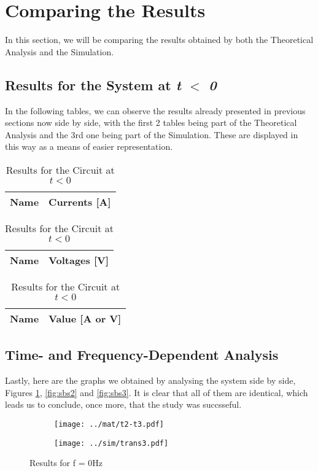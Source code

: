\clearpage

\section{Comparing the Results}
\label{sec:comparing}

In this section, we will be comparing the results obtained by both the Theoretical Analysis and the Simulation.

\subsection{Results for the System at \textit{t $<$ 0}}

In the following tables, we can observe the results already presented in previous sections now side by side, with the first
2 tables being part of the Theoretical Analysis and the 3rd one being part of the Simulation. These are displayed in this
way as a means of easier representation.

\begin{table}[htb!]
  \begin{tabular}{|l|r|}
      \hline    
      {\bf Name} & {\bf Currents [A]} \\ \hline
      
  \end{tabular}
\quad
  \begin{tabular}{|l|r|}
    \hline    
    {\bf Name} & {\bf Voltages [V]} \\ \hline
    
  \end{tabular}
\quad
  \begin{tabular}{|l|r|}
    \hline    
    {\bf Name} & {\bf Value [A or V]} \\ \hline
    
  \end{tabular}
  \caption{Results for the Circuit at $t<0$}
\end{table}

\clearpage
\subsection{Time- and Frequency-Dependent Analysis}

Lastly, here are the graphs we obtained by analysing the system side by side, Figures \ref{fig:sbs1}, \ref{fig:sbs2} and \ref{fig:sbs3}. It is clear that all of them are identical, which leads us to conclude, once more, that the study was succsseful.

\begin{figure}[ht]
\centering
\begin{subfigure}{.5\textwidth}
  \centering
  \texttt{[image: ../mat/t2-t3.pdf]}
\end{subfigure}%
\begin{subfigure}{.4\textwidth}
  \centering
  \texttt{[image: ../sim/trans3.pdf]}
\end{subfigure}
\caption{Results for f = 0Hz}
\label{fig:sbs1}
\end{figure}